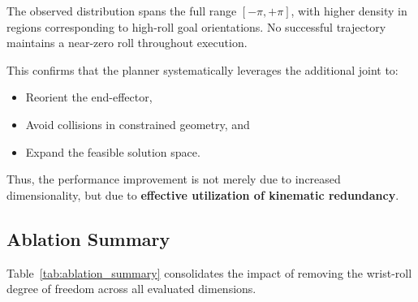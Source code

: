 \documentclass[conference]{IEEEtran}
\begin{document}
	The observed distribution spans the full range $[-\pi, +\pi]$, with higher density in regions corresponding to high-roll goal orientations. No successful trajectory maintains a near-zero roll throughout execution.
	
	This confirms that the planner systematically leverages the additional joint to:
	\begin{itemize}
		\item Reorient the end-effector,
		\item Avoid collisions in constrained geometry, and
		\item Expand the feasible solution space.
	\end{itemize}
	
	Thus, the performance improvement is not merely due to increased dimensionality, but due to \textbf{effective utilization of kinematic redundancy}.
	
	\subsection{Ablation Summary}
	
	Table~\ref{tab:ablation_summary} consolidates the impact of removing the wrist-roll degree of freedom across all evaluated dimensions.
	
%			
%			
%			
%			
%			
%			
%			
	
\end{document}
